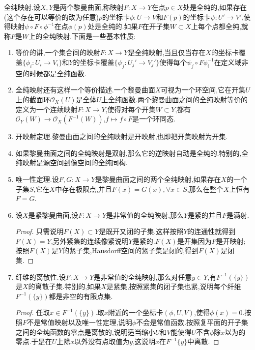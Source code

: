 全纯映射.设$X,Y$是两个黎曼曲面,称映射$F:X\to Y$在点$p\in X$处是全纯的,如果存在(这个存在可以等价的改为任意)$p$的坐标卡$\phi:U\to V$和$F(p)$的坐标卡$\psi:U'\to V'$,使得映射$\psi\circ F\circ\phi^{-1}$在点$\phi(p)$处是全纯的.如果$F$在开子集$W\subset X$上每个点都全纯,就称$F$是$W$上的全纯映射.下面是一些基本性质:
\begin{enumerate}
	\item 等价的讲,一个集合间的映射$F:X\to Y$是全纯映射,当且仅当存在$X$的坐标卡覆盖$\{\phi_i:U_i\to V_i\}$和$Y$的坐标卡覆盖$\{\psi_j:U_j'\to V_j'\}$使得每个$\psi_j\circ F\phi_i^{-1}$在定义域非空的时候都是全纯函数.
	\item 全纯映射还有这样一个等价描述.一个黎曼曲面$X$可视为一个环空间,它在开集$U$上的截面环$\mathscr{O}_X(U)$是全体$U$上全纯函数.两个黎曼曲面之间的全纯映射等价的定义为一个连续映射$F:X\to Y$,使得对每个开集$W\subset Y$,都有$\mathscr{O}_Y(W)\to\mathscr{O}_X(F^{-1}(W))$,$f\mapsto f\circ F$是一个环同态.
	\item 开映射定理.黎曼曲面之间的全纯映射是开映射,也即把开集映射为开集.
	\item 如果黎曼曲面之间的全纯映射是双射,那么它的逆映射自动是全纯的.特别的,全纯映射是源空间到像空间的全纯同构.
	\item 唯一性定理.设$F,G:X\to Y$是黎曼曲面之间的两个全纯映射,如果存在$X$的一个子集$S$,它在$X$中存在极限点,并且$F(x)=G(x),\forall x\in S$,那么在整个$X$上恒有$F=G$.
	\item 设$X$是紧黎曼曲面,设$F:X\to Y$是非常值的全纯映射,那么$Y$是紧的并且$F$是满射.
	\begin{proof}
		
		只需说明$F(X)\subset Y$是既开又闭的子集.这样按照$Y$的连通性就得到$F(X)=Y$,另外紧集的连续像紧说明$Y$是紧的.$F(X)$是开集因为$F$是开映射;按照$F(X)$是$Y$的紧子集,Hausdorff空间的紧子集是闭的,得到$F(X)$是闭集.	
	\end{proof}
	\item 纤维的离散性.设$F:X\to Y$是非常值的全纯映射,那么对任意$y\in Y$,有$F^{-1}(\{y\})$是$X$的离散子集.特别的,如果$X$是紧集,按照紧集的闭子集也紧,说明每个纤维$F^{-1}(\{y\})$都是非空的有限点集.
	\begin{proof}
		
		任取$x\in F^{-1}(\{y\})$.取$x$附近的一个坐标卡$(\phi,U,V)$,使得$\phi(x)=0$.按照$F$不是常值映射以及唯一性定理,说明$\phi$不会是常值函数.按照复平面的开子集之间的全纯函数的零点是离散的,说明适当缩小$U$和$V$能使得$U$不含$\phi$除$x$以为的零点.于是在$U$上除$x$以外没有点取值为$y$,这说明$x$在$F^{-1}\{y\}$中离散.
	\end{proof}
\end{enumerate}

